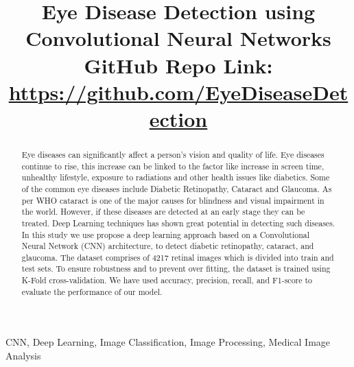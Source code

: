 \documentclass[conference]{IEEEtran}
\begin{document}
\title{Eye Disease Detection using Convolutional Neural Networks\\
\vspace{10pt}
\fontsize{12}{14}\selectfont GitHub Repo Link: \href{https://github.com/VishanthSurresh/COMP478-Image_Processing_Project-Eye_Disease_Classification/blob/main/CNN\%20Model/eye-disease-classification.ipynb}{https://github.com/EyeDiseaseDetection}
}




\author{
\and
{}
}
\maketitle

\begin{abstract}
Eye diseases can significantly affect a person’s vision and quality of life. Eye diseases continue to rise, this increase can be linked to the factor like increase in screen time, unhealthy lifestyle, exposure to radiations and other health issues like diabetics. Some of the common eye diseases include Diabetic Retinopathy, Cataract and Glaucoma. As per WHO cataract is one of the major causes for blindness and visual impairment in the world. However, if these diseases are detected at an early stage they can be treated. Deep Learning techniques has shown great potential in detecting such diseases. In this study we use propose a deep learning approach based on a Convolutional Neural Network (CNN) architecture, to detect diabetic retinopathy, cataract, and glaucoma. The dataset comprises of 4217 retinal images which is divided into train and test sets. To ensure robustness and to prevent over fitting, the dataset is trained using K-Fold cross-validation. We have used accuracy, precision, recall, and F1-score to evaluate the performance of our model. 
\end{abstract}
\begin{IEEEkeywords}
CNN, Deep Learning, Image Classification, Image Processing, Medical Image Analysis
\end{IEEEkeywords}
\end{document}
